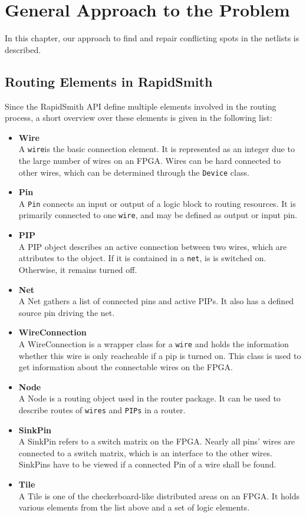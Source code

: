 \chapter{General Approach to the Problem}
\label{cha:approachestotheproblem}

In this chapter, our approach to find and repair conflicting spots in the netlists is described.

\section{Routing Elements in RapidSmith}
\label{sec:routingelementsinrapidsmith}

Since the RapidSmith API define multiple elements involved in the routing process, a short overview over these elements is given in the following list:
\begin{itemize}
\item \textbf{Wire}\hfill \\
A \texttt{wire}is the basic connection element. It is represented as an integer due to the large number of wires on an FPGA. Wires can be hard connected to other wires, which can be determined through the \texttt{Device} class.
\item \textbf{Pin}\hfill \\
A \texttt{Pin} connects an input or output of a logic block to routing resources. It is primarily connected to one \texttt{wire}, and may be defined as output or input pin.
\item \textbf{PIP}\hfill \\
A PIP object describes an active connection between two wires, which are attributes to the object. If it is contained in a \texttt{net}, is is switched on. Otherwise, it remains turned off.
\item \textbf{Net}\hfill \\
A Net gathers a list of connected pins and active PIPs. It also has a defined source pin driving the net.
\item \textbf{WireConnection}\hfill \\
A WireConnection is a wrapper class for a \texttt{wire} and holds the information whether this wire is only reacheable if a pip is turned on. This class is used to get information about the connectable wires on the FPGA.
\item \textbf{Node}\hfill \\
A Node is a routing object used in the router package. It can be used to describe routes of \texttt{wires} and \texttt{PIPs} in a router.
\item \textbf{SinkPin}\hfill \\
A SinkPin refers to a switch matrix on the FPGA. Nearly all pins' wires are connected to a switch matrix, which is an interface to the other wires. SinkPins have to be viewed if a connected Pin of a wire shall be found.
\item \textbf{Tile}\hfill \\
A Tile is one of the checkerboard-like distributed areas on an FPGA. It holds various elements from the list above and a set of logic elements. 

\end{itemize}

